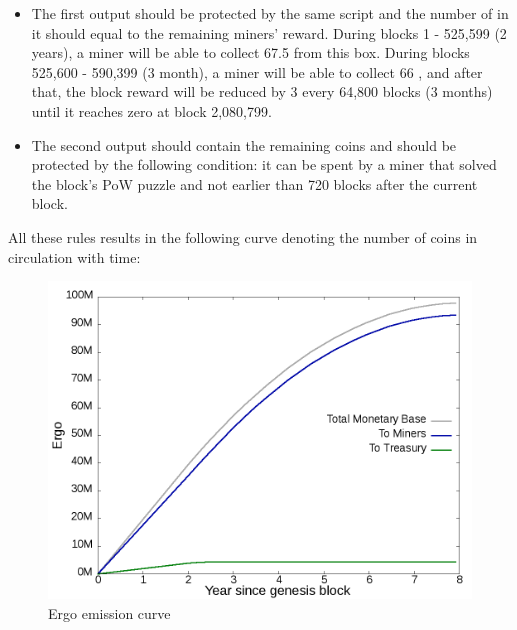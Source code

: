 \begin{itemize}
    \begin{itemize}
    \item{} The first output should be protected by the same script and the number of \Erg{} in it should
    equal to the remaining miners' reward.
    During blocks 1 - 525,599 (2 years), a miner will be able to collect 67.5 \Erg{} from this box. During blocks 525,600 - 590,399 (3 month), a miner will be able to collect 66 \Erg{}, and after that, the block reward will be reduced by 3 \Erg{} every 64,800 blocks (3 months) until it reaches zero at block 2,080,799.

    \item{} The second output should contain the remaining coins and should be protected by the following condition:
    it can be spent by a miner that solved the block's PoW puzzle and not earlier than 720 blocks after the current block.
    \end{itemize}

\end{itemize}

All these rules results in the following curve denoting the number of coins in circulation with time:

\begin{figure}[H]
    \centering
    \includegraphics[width=\textwidth]{img/emission.png}
    \caption{Ergo emission curve
    \label{fig:emission} }
\end{figure}
